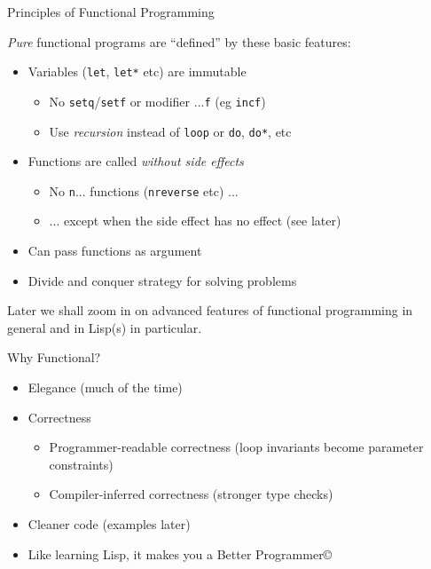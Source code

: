 \documentclass[presentation]{beamer}
\begin{document}
\begin{frame}{Principles of Functional Programming}
\label{sec:orgf4f5447}

\emph{Pure} functional programs are ``defined'' by these basic features:

\begin{itemize}
\item Variables (\texttt{let}, \texttt{let*} etc) are immutable
  \begin{itemize}
  \item No \texttt{setq}/\texttt{setf} or modifier ...\texttt{f} (eg \texttt{incf})
  \item Use \emph{recursion} instead of \texttt{loop} or \texttt{do}, \texttt{do*}, etc
  \end{itemize}
\item Functions are called \emph{without side effects}
  \begin{itemize}
  \item No \texttt{n}... functions (\texttt{nreverse} etc) ...
  \item ... except when the side effect has no effect (see later)
  \end{itemize}
\item Can pass functions as argument
\item Divide and conquer strategy for solving problems
\end{itemize}

Later we shall zoom in on advanced features of functional programming in general and in Lisp(s) in particular.

\end{frame}

\begin{frame}{Why Functional?}
  \begin{itemize}
  \item Elegance (much of the time)
  \item Correctness
    \begin{itemize}
    \item Programmer-readable correctness (loop invariants become parameter constraints)
    \item Compiler-inferred correctness (stronger type checks)
    \end{itemize}
  \item Cleaner code (examples later)
  \item Like learning Lisp, it makes you a Better Programmer\copyright
  \end{itemize}
\end{frame}
\end{document}
